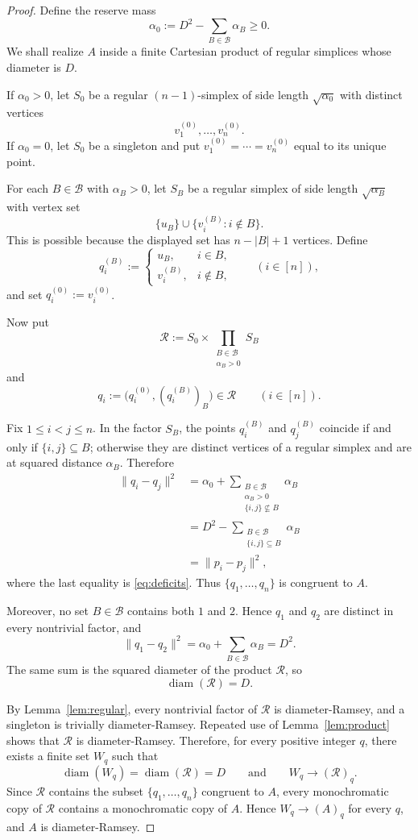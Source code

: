 \documentclass[10pt,a4paper]{amsart}
\DeclareMathOperator{\diam}{diam}
\begin{document}
\begin{proof}
Define the reserve mass
\[
\alpha_0:=D^2-\sum_{B\in\mathcal B}\alpha_B\ge 0.
\]
We shall realize $A$ inside a finite Cartesian product of regular simplices whose diameter is $D$.

If $\alpha_0>0$, let $S_0$ be a regular $(n-1)$-simplex of side length $\sqrt{\alpha_0}$ with distinct vertices
\[
v_1^{(0)},\dots,v_n^{(0)}.
\]
If $\alpha_0=0$, let $S_0$ be a singleton and put $v_1^{(0)}=\cdots=v_n^{(0)}$ equal to its unique point.

For each $B\in\mathcal B$ with $\alpha_B>0$, let $S_B$ be a regular simplex of side length $\sqrt{\alpha_B}$ with vertex set
\[
\{u_B\}\cup\{v_i^{(B)}:i\notin B\}.
\]
This is possible because the displayed set has $n-|B|+1$ vertices. Define
\[
q_i^{(B)}:=
\begin{cases}
 u_B, & i\in B,\\[1mm]
 v_i^{(B)}, & i\notin B,
\end{cases}
\qquad (i\in[n]),
\]
and set $q_i^{(0)}:=v_i^{(0)}$.

Now put
\[
\mathcal R:=S_0\times \prod_{\substack{B\in\mathcal B\\ \alpha_B>0}} S_B
\]
and
\[
q_i:=\bigl(q_i^{(0)},(q_i^{(B)})_B\bigr)\in\mathcal R
\qquad (i\in[n]).
\]

Fix $1\le i<j\le n$. In the factor $S_B$, the points $q_i^{(B)}$ and $q_j^{(B)}$ coincide if and only if $\{i,j\}\subseteq B$; otherwise they are distinct vertices of a regular simplex and are at squared distance $\alpha_B$. Therefore
\begin{align*}
\|q_i-q_j\|^2
&=\alpha_0+
\sum_{\substack{B\in\mathcal B\\ \alpha_B>0\\ \{i,j\}\nsubseteq B}}\alpha_B \\
&=D^2-
\sum_{\substack{B\in\mathcal B\\ \{i,j\}\subseteq B}}\alpha_B \\
&=\|p_i-p_j\|^2,
\end{align*}
where the last equality is \eqref{eq:deficits}. Thus $\{q_1,\dots,q_n\}$ is congruent to $A$.

Moreover, no set $B\in\mathcal B$ contains both $1$ and $2$. Hence $q_1$ and $q_2$ are distinct in every nontrivial factor, and
\[
\|q_1-q_2\|^2
=\alpha_0+
\sum_{B\in\mathcal B}\alpha_B
=D^2.
\]
The same sum is the squared diameter of the product $\mathcal R$, so
\[
\diam(\mathcal R)=D.
\]

By Lemma~\ref{lem:regular}, every nontrivial factor of $\mathcal R$ is diameter-Ramsey, and a singleton is trivially diameter-Ramsey. Repeated use of Lemma~\ref{lem:product} shows that $\mathcal R$ is diameter-Ramsey. Therefore, for every positive integer $q$, there exists a finite set $W_q$ such that
\[
\diam(W_q)=\diam(\mathcal R)=D
\qquad\text{and}\qquad
W_q\to(\mathcal R)_q.
\]
Since $\mathcal R$ contains the subset $\{q_1,\dots,q_n\}$ congruent to $A$, every monochromatic copy of $\mathcal R$ contains a monochromatic copy of $A$. Hence $W_q\to(A)_q$ for every $q$, and $A$ is diameter-Ramsey.
\end{proof}
\end{document}
